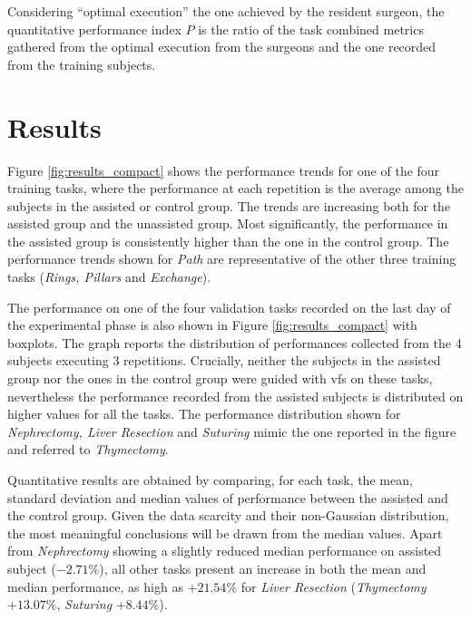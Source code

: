\documentclass{article}
\begin{document}
\begin{multicols}{2}
Considering ``optimal execution'' the one achieved by the resident surgeon, the quantitative performance index $P$ is the ratio of the task combined metrics gathered from the optimal execution from the surgeons and the one recorded from the training subjects. 

\section{Results}
Figure \ref{fig:results_compact} shows the performance trends for one of the four training tasks, where the performance at each repetition is the average among the subjects in the assisted or control group. The trends are increasing both for the assisted group and the unassisted group. Most significantly, the performance in the assisted group is consistently higher than the one in the control group. The performance trends shown for \textit{Path} are representative of the other three training tasks (\textit{Rings, Pillars} and \textit{Exchange}).

The performance on one of the four validation tasks recorded on the last day of the experimental phase is also shown in Figure \ref{fig:results_compact} with boxplots. The graph reports the distribution of performances collected from the 4 subjects executing 3 repetitions. Crucially, neither the subjects in the assisted group nor the ones in the control group were guided with \acp{vf} on these tasks, nevertheless the performance recorded from the assisted subjects is distributed on higher values for all the tasks. The performance distribution shown for \textit{Nephrectomy, Liver Resection} and \textit{Suturing} mimic the one reported in the figure and referred to \textit{Thymectomy}.

Quantitative results are obtained by comparing, for each task, the mean, standard deviation and median values of performance between the assisted and the control group. Given the data scarcity and their non-Gaussian distribution, the most meaningful conclusions will be drawn from the median values. Apart from \textit{Nephrectomy} showing a slightly reduced median performance on assisted subject ($-2.71\%$), all other tasks present an increase in both the mean and median performance, as high as $+21.54\%$ for \textit{Liver Resection} (\textit{Thymectomy} $+13.07\%$, \textit{Suturing} $+8.44\%$).


\end{multicols}
\end{document}
